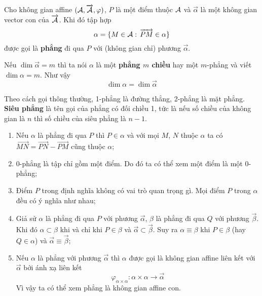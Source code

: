 \begin{definition}[Phẳng]
	Cho không gian affine $(\mathcal{A}, \overrightarrow{\mathcal{A}}, \varphi)$, $P$ là một điểm thuộc $\mathcal{A}$ và $\overrightarrow{\alpha}$ là một không gian vector con của $\overrightarrow{\mathcal{A}}$. Khi đó tập hợp 
    \begin{equation*}
        \alpha = \{ M \in \mathcal{A}: \, \overrightarrow{PM} \in \alpha\}
    \end{equation*}
    được gọi là \textbf{phẳng} đi qua $P$ với (không gian chỉ) phương $\overrightarrow{\alpha}$.
\end{definition}

Nếu $\dim \overrightarrow{\alpha} = m$ thì ta nói $\alpha$ là một \textbf{phẳng $m$ chiều} hay một $m$-phẳng và viết $\dim \alpha = m$. Như vậy \[\dim \alpha = \dim \overrightarrow{\alpha}\]

Theo cách gọi thông thường, 1-phẳng là đường thẳng, 2-phẳng là mặt phẳng. \textbf{Siêu phẳng} là tên gọi của phẳng có đối chiều 1, tức là nếu số chiều của không gian là $n$ thì số chiều của siêu phẳng là $n-1$.

\begin{remark}

\begin{enumerate}
	\item Nếu $\alpha$ là phẳng đi qua $P$ thì $P \in \alpha$ và với mọi $M$, $N$ thuộc $\alpha$ ta có $\overrightarrow{MN} = \overrightarrow{PN} - \overrightarrow{PM}$ cũng thuộc $\alpha$;
	\item 0-phẳng là tập chỉ gồm một điểm. Do đó ta có thể xem một điểm là một 0-phẳng;
	\item Điểm $P$ trong định nghĩa không có vai trò quan trọng gì. Mọi điểm $P$ trong $\alpha$ đều có ý nghĩa như nhau;
	\item Giả sử $\alpha$ là phẳng đi qua $P$ với phương $\overrightarrow{\alpha}$, $\beta$ là phẳng đi qua $Q$ với phương $\overrightarrow{\beta}$. Khi đó $\alpha \subset \beta$ khi và chỉ khi $P \in \beta$ và $\overrightarrow{\alpha} \subset \overrightarrow{\beta}$. Suy ra $\alpha \equiv \beta$ khi $P \in \beta$ (hay $Q \in \alpha$) và $\overrightarrow{\alpha} \equiv \overrightarrow{\beta}$;
	\item Nếu $\alpha$ là phẳng với phương $\overrightarrow{\alpha}$ thì $\alpha$ được gọi là không gian affine liên kết với $\overrightarrow{\alpha}$ bởi ánh xạ liên kết
    \begin{equation*}
        \varphi_{\alpha \times \alpha}: \alpha \times \alpha \to \overrightarrow{\alpha}
    \end{equation*}
	Vì vậy ta có thể xem phẳng là không gian affine con.
\end{enumerate}
\end{remark}

